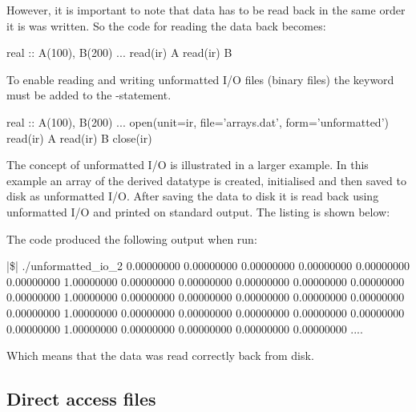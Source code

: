 However, it is important to note that data has to be read back in the same order it is was written. So the code for reading the data back becomes:

\begin{fortrancodeenv}
real :: A(100), B(200)
...
read(ir) A
read(ir) B
\end{fortrancodeenv}

To enable reading and writing unformatted I/O files (binary files) the keyword  must be added to the -statement. 

\begin{fortrancodeenv}
real :: A(100), B(200)
...
open(unit=ir, file='arrays.dat', form='unformatted')
read(ir) A
read(ir) B
close(ir)
\end{fortrancodeenv}

The concept of unformatted I/O is illustrated in a larger example. In this example an array of the derived datatype  is created, initialised and then saved to disk as unformatted I/O. After saving the data to disk it is read back using unformatted I/O and printed on standard output. The listing is shown below:


The code produced the following output when run:

\cmdmode

\begin{fortrancodeenv}
|\$| ./unformatted_io_2
   0.00000000       0.00000000       0.00000000       0.00000000       0.00000000       0.00000000       1.00000000       0.00000000       0.00000000       0.00000000       0.00000000       0.00000000       0.00000000       1.00000000       0.00000000       0.00000000       0.00000000       0.00000000       0.00000000       0.00000000       1.00000000       0.00000000       0.00000000       0.00000000       0.00000000       0.00000000       0.00000000       1.00000000       0.00000000       0.00000000       0.00000000       0.00000000 ....
\end{fortrancodeenv}

Which means that the data was read correctly back from disk. 

\subsection{Direct access files}

